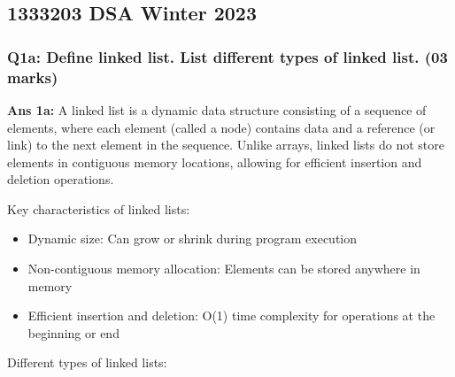 \documentclass[]{article}
\providecommand{\tightlist}{%
  \setlength{\itemsep}{0pt}\setlength{\parskip}{0pt}}
\begin{document}
\hypertarget{dsa-winter-2023}{%
\subsection{1333203 DSA Winter 2023}\label{dsa-winter-2023}}

\hypertarget{q1a-define-linked-list.-list-different-types-of-linked-list.-03-marks}{%
\subsubsection{Q1a: Define linked list. List different types of linked
list. (03
marks)}\label{q1a-define-linked-list.-list-different-types-of-linked-list.-03-marks}}

\textbf{Ans 1a:} A linked list is a dynamic data structure consisting of
a sequence of elements, where each element (called a node) contains data
and a reference (or link) to the next element in the sequence. Unlike
arrays, linked lists do not store elements in contiguous memory
locations, allowing for efficient insertion and deletion operations.

Key characteristics of linked lists:

\begin{itemize}
\tightlist
\item
  Dynamic size: Can grow or shrink during program execution
\item
  Non-contiguous memory allocation: Elements can be stored anywhere in
  memory
\item
  Efficient insertion and deletion: O(1) time complexity for operations
  at the beginning or end
\end{itemize}

Different types of linked lists:
\end{document}
